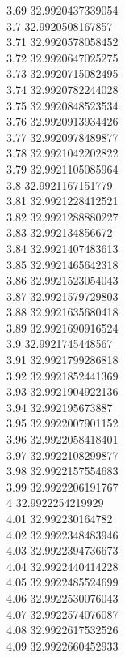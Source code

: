 {3.69	32.9920437339054\\
3.7	32.9920508167857\\
3.71	32.9920578058452\\
3.72	32.9920647025275\\
3.73	32.9920715082495\\
3.74	32.9920782244028\\
3.75	32.9920848523534\\
3.76	32.9920913934426\\
3.77	32.9920978489877\\
3.78	32.9921042202822\\
3.79	32.9921105085964\\
3.8	32.9921167151779\\
3.81	32.9921228412521\\
3.82	32.9921288880227\\
3.83	32.992134856672\\
3.84	32.9921407483613\\
3.85	32.9921465642318\\
3.86	32.9921523054043\\
3.87	32.9921579729803\\
3.88	32.9921635680418\\
3.89	32.9921690916524\\
3.9	32.9921745448567\\
3.91	32.9921799286818\\
3.92	32.9921852441369\\
3.93	32.9921904922136\\
3.94	32.992195673887\\
3.95	32.9922007901152\\
3.96	32.9922058418401\\
3.97	32.9922108299877\\
3.98	32.9922157554683\\
3.99	32.9922206191767\\
4	32.9922254219929\\
4.01	32.992230164782\\
4.02	32.9922348483946\\
4.03	32.9922394736673\\
4.04	32.9922440414228\\
4.05	32.9922485524699\\
4.06	32.9922530076043\\
4.07	32.9922574076087\\
4.08	32.9922617532526\\
4.09	32.9922660452933\\
}
